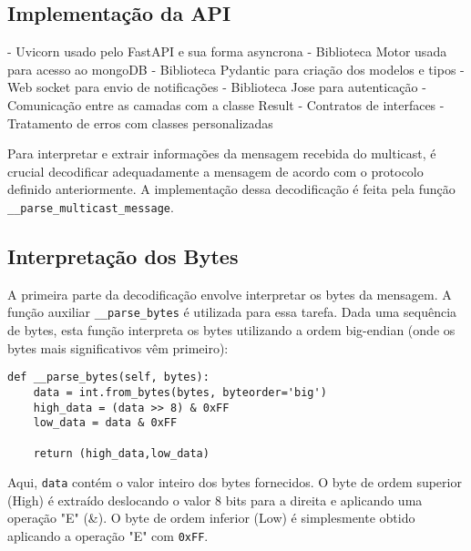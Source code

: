 

\subsection[Implementação da API]{Implementação da API}

- Uvicorn usado pelo FastAPI e sua forma asyncrona
- Biblioteca Motor usada para acesso ao mongoDB
- Biblioteca Pydantic para criação dos modelos e tipos
- Web socket para envio de notificações
- Biblioteca Jose para autenticação
- Comunicação entre as camadas com a classe Result
- Contratos de interfaces
- Tratamento de erros com classes personalizadas

Para interpretar e extrair informações da mensagem recebida do multicast, é crucial decodificar adequadamente a mensagem de acordo com o protocolo definido anteriormente. A implementação dessa decodificação é feita pela função \texttt{\_\_parse\_multicast\_message}. 

\subsection{Interpretação dos Bytes}

A primeira parte da decodificação envolve interpretar os bytes da mensagem. A função auxiliar \texttt{\_\_parse\_bytes} é utilizada para essa tarefa. Dada uma sequência de bytes, esta função interpreta os bytes utilizando a ordem big-endian (onde os bytes mais significativos vêm primeiro):

\begin{verbatim}
def __parse_bytes(self, bytes):
    data = int.from_bytes(bytes, byteorder='big')
    high_data = (data >> 8) & 0xFF
    low_data = data & 0xFF

    return (high_data,low_data)
\end{verbatim}

Aqui, \texttt{data} contém o valor inteiro dos bytes fornecidos. O byte de ordem superior (High) é extraído deslocando o valor 8 bits para a direita e aplicando uma operação "E" (\&). O byte de ordem inferior (Low) é simplesmente obtido aplicando a operação "E" com \texttt{0xFF}.

